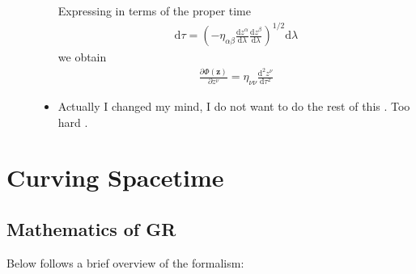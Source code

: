 \documentclass[12pt]{report}
\newcommand{\rd}[2]{\frac{\mathrm{d}#1}{\mathrm{d}#2}}
\newcommand{\pd}[2]{\frac{\partial#1}{\partial#2}}
\newcommand{\rtd}[2]{\frac{\mathrm{d}^2#1}{\mathrm{d}#2^2}}
\newcommand{\bm}[1]{\boldsymbol{\mathbf{#1}}}
\begin{document}
\begin{description}
\begin{itemize}
                Expressing in terms of the proper time
                \begin{align*}
                    \mathrm{d}\tau =
                    \left( -\eta_{\alpha\beta}
                    \rd{z^\alpha}{\lambda}
                    \rd{z^\beta}{\lambda}\right)^{1/2} \mathrm{d}\lambda
                \end{align*}
                we obtain
                \begin{align*}
                    \pd{\Phi(\bm{z})}{z^\nu} = \eta_{\nu\nu}\rtd{z^\nu}{\tau}
                \end{align*}

            \item Actually I changed my mind, I do not want to do the rest of
                this \smiley. Too hard \frownie.
        \end{itemize}
\end{description}

\chapter{Curving Spacetime}

\section{Mathematics of GR}

Below follows a brief overview of the formalism:
\end{document}

